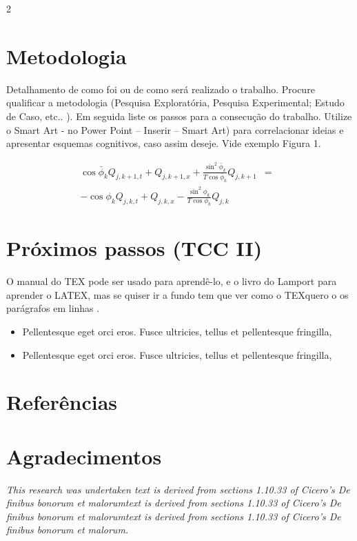 \documentclass[article,9pt,a4paper]{abntex2}
\begin{document}
\begin{multicols}{2}
\section{Metodologia}
Detalhamento de como foi ou de como será realizado o trabalho. Procure qualificar a metodologia (Pesquisa Exploratória, Pesquisa Experimental; Estudo de Caso, etc.. ). Em seguida liste os passos para a consecução do trabalho. Utilize o Smart Art - no Power Point – Inserir – Smart Art) para correlacionar ideias e apresentar esquemas cognitivos, caso assim deseje. Vide exemplo Figura 1.


\begin{eqnarray}
\cos\bar{\phi}_k Q_{j,k+1,t} + Q_{j,k+1,x}+\frac{\sin^2\bar{\phi}_k}{T\cos\bar{\phi}_k} Q_{j,k+1} &=&\nonumber\\ 
-\cos\phi_k Q_{j,k,t} + Q_{j,k,x}-\frac{\sin^2\phi_k}{T\cos\phi_k} Q_{j,k}\label{edgek}
\end{eqnarray}


\section{Próximos passos (TCC II)}
O manual do TEX \cite{audy2009} pode ser usado para aprendê-lo, e o livro do Lamport \cite{farinelli2007} para aprender o LATEX, mas se quiser ir a fundo tem que ver como o TEXquero o os parágrafos em linhas \cite{Leite2009}.

\begin{itemize}
    \item Pellentesque eget orci eros. Fusce ultricies, tellus et pellentesque fringilla,
    \item Pellentesque eget orci eros. Fusce ultricies, tellus et pellentesque fringilla,
\end{itemize}

\renewcommand\bibsection
{
   \section*{\vspace{-\baselineskip}}
   
}
\section*{Referências}\vspace{-0.8cm}

\section*{Agradecimentos}
\textit{\small This research was undertaken text is derived from sections 1.10.33 of Cicero’s De finibus bonorum et malorumtext is derived from
sections 1.10.33 of Cicero’s De finibus bonorum et malorumtext is derived from sections 1.10.33 of Cicero’s De finibus bonorum et
malorum.}

\end{multicols}
\end{document}
